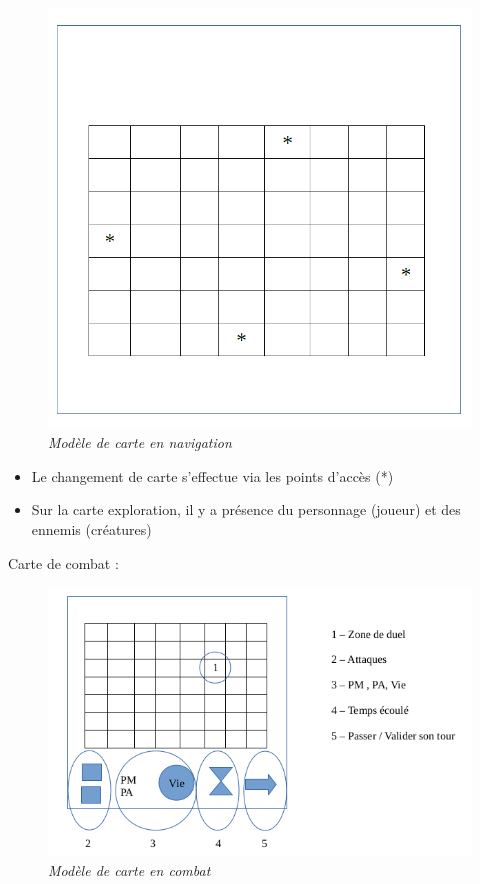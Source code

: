 \documentclass[11pt, a4paper]{article}
\begin{document}
\begin{figure}[H]
  \centering
  \includegraphics[scale=0.7]{img/CarteExplo.png}
  \caption{\emph{Modèle de carte en navigation}}
\end{figure}

\begin{itemize}
\item Le changement de carte s’effectue via les points d’accès (*)
\item Sur la carte exploration, il y a présence du personnage (joueur) et des ennemis (créatures)\\
\end{itemize}

Carte de combat :

\begin{figure}[H]
  \centering
  \includegraphics[scale=0.5]{img/CarteCombat.png}
  \caption{\emph{Modèle de carte en combat}}
\end{figure}
\end{document}
